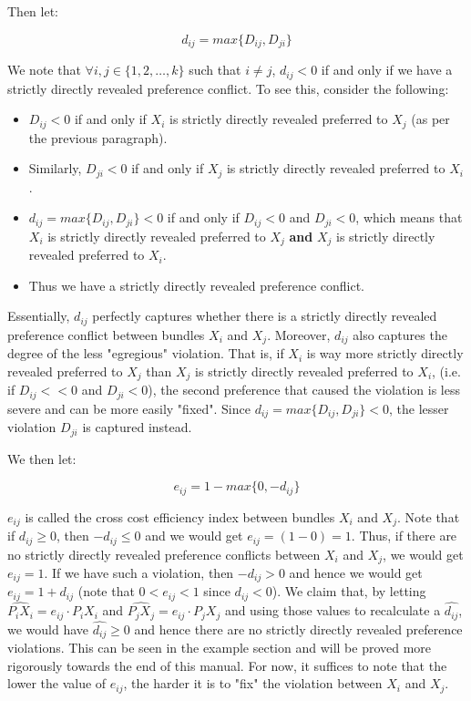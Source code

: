 \documentclass{article} %
\begin{document}
Then let:

$$d_{ij}=max\{D_{ij}, D_{ji}\}$$

We note that $\forall i,j\in\{1,2,\ldots,k\}$ such that $i\not=j$, $d_{ij}<0$ if and only if we have a strictly directly revealed preference conflict. To see this, consider the following:

\begin{itemize}
    \item $D_{ij}<0$ if and only if $X_{i}$ is strictly directly revealed preferred to $X_{j}$ (as per the previous paragraph). 
    \item Similarly, $D_{ji}<0$ if and only if $X_{j}$ is strictly directly revealed preferred to $X_{i}$.
    \item $d_{ij}=max\{D_{ij}, D_{ji}\}<0$ if and only if $D_{ij}<0$ and $D_{ji}<0$, which means that $X_{i}$ is strictly directly revealed preferred to $X_{j}$ \textbf{and} $X_{j}$ is strictly directly revealed preferred to $X_{i}$. 
    \item Thus we have a strictly directly revealed preference conflict.
\end{itemize}
Essentially, $d_{ij}$ perfectly captures whether there is a strictly directly revealed preference conflict between bundles $X_{i}$ and $X_{j}$. Moreover, $d_{ij}$ also captures the degree of the less "egregious" violation. That is, if $X_{i}$ is way more strictly directly revealed preferred to $X_{j}$ than $X_{j}$ is strictly directly revealed preferred to $X_{i}$, (i.e. if $D_{ij}<<0$ and $D_{ji}<0$), the second preference that caused the violation is less severe and can be more easily "fixed". Since $d_{ij}=max\{D_{ij}, D_{ji}\}<0$, the lesser violation $D_{ji}$ is captured instead.
\bigskip

We then let:

$$e_{ij}=1-max\{0,-d_{ij}\}$$

$e_{ij}$ is called the cross cost efficiency index between bundles $X_{i}$ and $X_{j}$. Note that if $d_{ij}\geq0$, then $-d_{ij}\leq0$ and we would get $e_{ij}=(1-0)=1$. Thus, if there are no strictly directly revealed preference conflicts between $X_{i}$ and $X_{j}$, we would get $e_{ij}=1$. If we have such a violation, then $-d_{ij}>0$ and hence we would get $e_{ij}=1+d_{ij}$ (note that $0<e_{ij}<1$ since $d_{ij}<0$). We claim that, by letting $\hat{ P_iX_i}=e_{ij}\cdot P_iX_i$ and $\hat{P_jX_j}=e_{ij}\cdot P_jX_j$ and using those values to recalculate a $\hat{d_{ij}}$, we would have $\hat{d_{ij}}\geq0$ and hence there are no strictly directly revealed preference violations. This can be seen in the example section and will be proved more rigorously towards the end of this manual. For now, it suffices to note that the lower the value of $e_{ij}$, the harder it is to "fix" the violation between $X_{i}$ and $X_{j}$.
\bigskip
\end{document}
